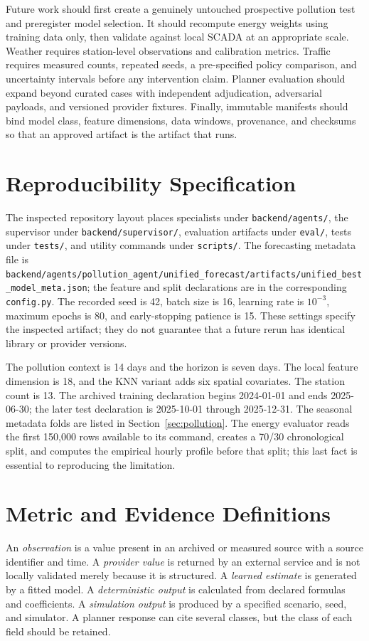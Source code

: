 \documentclass[conference]{IEEEtran}
\begin{document}
Future work should first create a genuinely untouched prospective pollution test and preregister model selection. It should recompute energy weights using training data only, then validate against local SCADA at an appropriate scale. Weather requires station-level observations and calibration metrics. Traffic requires measured counts, repeated seeds, a pre-specified policy comparison, and uncertainty intervals before any intervention claim. Planner evaluation should expand beyond curated cases with independent adjudication, adversarial payloads, and versioned provider fixtures. Finally, immutable manifests should bind model class, feature dimensions, data windows, provenance, and checksums so that an approved artifact is the artifact that runs.

\appendices
\section{Reproducibility Specification}
The inspected repository layout places specialists under \texttt{backend/agents/}, the supervisor under \texttt{backend/supervisor/}, evaluation artifacts under \texttt{eval/}, tests under \texttt{tests/}, and utility commands under \texttt{scripts/}. The forecasting metadata file is \texttt{backend/agents/pollution\_agent/unified\_forecast/artifacts/unified\_best\_model\_meta.json}; the feature and split declarations are in the corresponding \texttt{config.py}. The recorded seed is 42, batch size is 16, learning rate is $10^{-3}$, maximum epochs is 80, and early-stopping patience is 15. These settings specify the inspected artifact; they do not guarantee that a future rerun has identical library or provider versions.

The pollution context is 14 days and the horizon is seven days. The local feature dimension is 18, and the KNN variant adds six spatial covariates. The station count is 13. The archived training declaration begins 2024-01-01 and ends 2025-06-30; the later test declaration is 2025-10-01 through 2025-12-31. The seasonal metadata folds are listed in Section~\ref{sec:pollution}. The energy evaluator reads the first 150,000 rows available to its command, creates a 70/30 chronological split, and computes the empirical hourly profile before that split; this last fact is essential to reproducing the limitation.

\section{Metric and Evidence Definitions}
An \emph{observation} is a value present in an archived or measured source with a source identifier and time. A \emph{provider value} is returned by an external service and is not locally validated merely because it is structured. A \emph{learned estimate} is generated by a fitted model. A \emph{deterministic output} is calculated from declared formulas and coefficients. A \emph{simulation output} is produced by a specified scenario, seed, and simulator. A planner response can cite several classes, but the class of each field should be retained.
\end{document}
